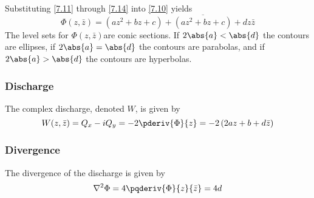 \documentclass[12pt]{article}
\begin{document}
%
Substituting \eqref{7.11} through \eqref{7.14} into \eqref{7.10} yields
%
\begin{equation}\label{7.15}
\boxed{
    \Phi(z,\bar{z}) = \left( az^2 + bz + c \right) + \overline{\left(az^2 + bz + c\right)} + dz\bar{z}
}
\end{equation}
%
The level sets for $\Phi(z,\bar{z})$are conic sections. If $2 \abs{a} < \abs{d}$ the contours are ellipses, if $2\abs{a} = \abs{d}$ the contours are parabolas, and if $2\abs{a} > \abs{d}$ the contours are hyperbolas.

\subsubsection{Discharge}
The complex discharge, denoted $W$, is given by
%
\begin{equation}\label{7.16}
    W(z,\bar{z}) = Q_x - i Q_y = -2 \pderiv{\Phi}{z} = -2 \left( 2az + b + d\bar{z} \right)
\end{equation}

\subsubsection{Divergence}
The divergence of the discharge is given by
%
\begin{equation}\label{7.17}
    \nabla^2 \Phi = 4 \pqderiv{\Phi}{z}{\bar{z}} = 4d
\end{equation}


\newpage
\end{document}
